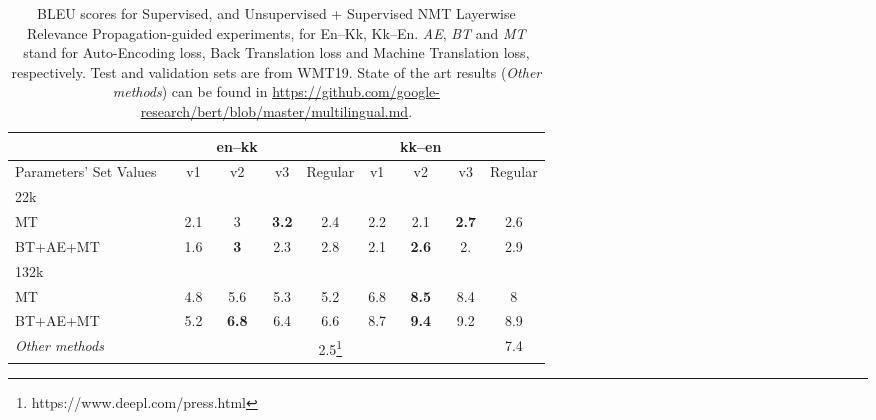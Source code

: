 \documentclass[11pt]{article}
\begin{document}
\begin{table*}[!htbp]
\small
\centering
\begin{tabular}{lcccc|c|ccc|c}
\toprule
&& & \textbf{en--kk} &&&& \textbf{kk--en} && \\\hline
Parameters' Set Values &  & v1 & v2 & v3 &Regular& v1 & v2 & v3 &Regular \\\hline
\midrule
22k  &  && &&&   &&\\
\midrule
MT  &&2.1&3&\textbf{3.2}&2.4&2.2&2.1&\textbf{2.7}&2.6 \\
BT+AE+MT &&1.6&\textbf{3}&2.3&2.8&2.1&\textbf{2.6}&2.&2.9\\
\midrule
\midrule
132k  &&&&&&&&\\
MT &&4.8&5.6&5.3&5.2&6.8&\textbf{8.5}&8.4&8\\
BT+AE+MT &&5.2&\textbf{6.8}&6.4&6.6&8.7&\textbf{9.4}&9.2&8.9\\
\midrule
\midrule
{\emph{Other methods}} &&&&&2.5\footnote{https://www.deepl.com/press.html} &  &&&7.4\\
\bottomrule
\end{tabular}

\caption{BLEU scores for Supervised, and Unsupervised + Supervised NMT Layerwise Relevance Propagation-guided experiments, for En--Kk, Kk--En. \emph{AE}, \emph{BT} and \emph{MT} stand for Auto-Encoding loss, Back Translation loss and Machine Translation loss, respectively. Test and validation sets are from WMT19. State of the art results (\textit{Other methods}) can be found in \url{https://github.com/google-research/bert/blob/master/multilingual.md}.}
\vspace{-2mm}
\label{table:bleu_results_lrp_train_kk}
\vspace{-0.5em}
\end{table*}
\end{document}
